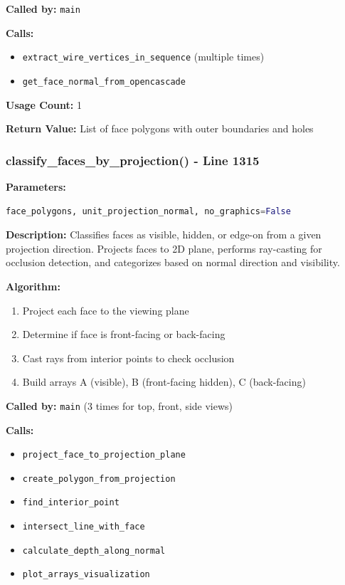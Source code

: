 \documentclass[11pt,a4paper]{article}
\begin{document}
\textbf{Called by:} \texttt{main}

\textbf{Calls:}
\begin{itemize}
    \item \texttt{extract\_wire\_vertices\_in\_sequence} (multiple times)
    \item \texttt{get\_face\_normal\_from\_opencascade}
\end{itemize}

\textbf{Usage Count:} 1

\textbf{Return Value:} List of face polygons with outer boundaries and holes

\subsubsection{classify\_faces\_by\_projection() - Line 1315}
\textbf{Parameters:}
\begin{lstlisting}[language=Python]
face_polygons, unit_projection_normal, no_graphics=False
\end{lstlisting}

\textbf{Description:}
Classifies faces as visible, hidden, or edge-on from a given projection direction. Projects faces to 2D plane, performs ray-casting for occlusion detection, and categorizes based on normal direction and visibility.

\textbf{Algorithm:}
\begin{enumerate}
    \item Project each face to the viewing plane
    \item Determine if face is front-facing or back-facing
    \item Cast rays from interior points to check occlusion
    \item Build arrays A (visible), B (front-facing hidden), C (back-facing)
\end{enumerate}

\textbf{Called by:} \texttt{main} (3 times for top, front, side views)

\textbf{Calls:}
\begin{itemize}
    \item \texttt{project\_face\_to\_projection\_plane}
    \item \texttt{create\_polygon\_from\_projection}
    \item \texttt{find\_interior\_point}
    \item \texttt{intersect\_line\_with\_face}
    \item \texttt{calculate\_depth\_along\_normal}
    \item \texttt{plot\_arrays\_visualization}
\end{itemize}
\end{document}

